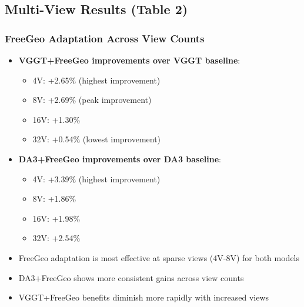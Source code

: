 \documentclass{article}
\begin{document}
\subsection{Multi-View Results (Table 2)}

\subsubsection{FreeGeo Adaptation Across View Counts}
\begin{itemize}
    \item \textbf{VGGT+FreeGeo improvements over VGGT baseline}:
    \begin{itemize}
        \item 4V: +2.65\% (highest improvement)
        \item 8V: +2.69\% (peak improvement)
        \item 16V: +1.30\%
        \item 32V: +0.54\% (lowest improvement)
    \end{itemize}

    \item \textbf{DA3+FreeGeo improvements over DA3 baseline}:
    \begin{itemize}
        \item 4V: +3.39\% (highest improvement)
        \item 8V: +1.86\%
        \item 16V: +1.98\%
        \item 32V: +2.54\%
    \end{itemize}

    \item FreeGeo adaptation is most effective at sparse views (4V-8V) for both models
    \item DA3+FreeGeo shows more consistent gains across view counts
    \item VGGT+FreeGeo benefits diminish more rapidly with increased views
\end{itemize}
\end{document}
